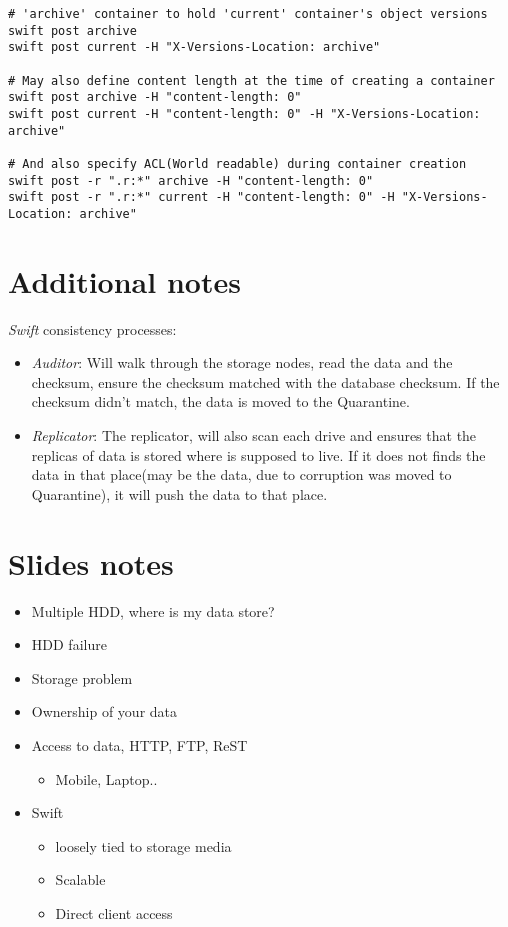 \documentclass{article}
\begin{document}
\begin{itemize}
\begin{verbatim}
# 'archive' container to hold 'current' container's object versions
swift post archive
swift post current -H "X-Versions-Location: archive"

# May also define content length at the time of creating a container
swift post archive -H "content-length: 0"
swift post current -H "content-length: 0" -H "X-Versions-Location: archive"

# And also specify ACL(World readable) during container creation
swift post -r ".r:*" archive -H "content-length: 0"
swift post -r ".r:*" current -H "content-length: 0" -H "X-Versions-Location: archive"
\end{verbatim}
\end{itemize}

\section{Additional notes}
\label{sec-3}
\emph{Swift} consistency processes:
\begin{itemize}
\item \emph{Auditor}: Will walk through the storage nodes, read the data and
the checksum, ensure the checksum matched with the database
checksum. If the checksum didn't match, the data is moved to the
Quarantine.
\item \emph{Replicator}: The replicator, will also scan each drive and
ensures that the replicas of data is stored where is supposed to
live. If it does not finds the data in that place(may be the
data, due to corruption was moved to Quarantine), it will push
the data to that place.
\end{itemize}

\section{Slides notes}
\label{sec-4}

\begin{itemize}
\item Multiple HDD, where is my data store?
\item HDD failure
\item Storage problem

\item Ownership of your data
\item Access to data, HTTP, FTP, ReST
\begin{itemize}
\item Mobile, Laptop..
\end{itemize}

\item Swift
\begin{itemize}
\item loosely tied to storage media
\item Scalable
\item Direct client access
\end{itemize}
\end{itemize}
\end{document}
